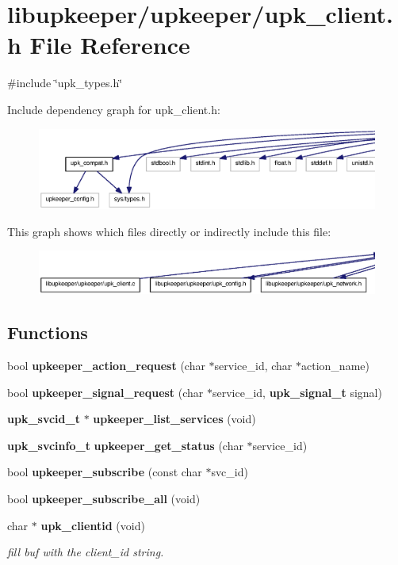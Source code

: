 \section{libupkeeper/upkeeper/upk\_\-client.h File Reference}
\label{upk__client_8h}
{\ttfamily \#include \char`\"{}upk\_\-types.h\char`\"{}}\par
Include dependency graph for upk\_\-client.h:
\nopagebreak
\begin{figure}[H]
\begin{center}
\leavevmode
\includegraphics[width=400pt]{upk__client_8h__incl}
\end{center}
\end{figure}
This graph shows which files directly or indirectly include this file:\nopagebreak
\begin{figure}[H]
\begin{center}
\leavevmode
\includegraphics[width=400pt]{upk__client_8h__dep__incl}
\end{center}
\end{figure}
\subsection*{Functions}
\begin{DoxyCompactItemize}
\item 
bool {\bf upkeeper\_\-action\_\-request} (char $\ast$service\_\-id, char $\ast$action\_\-name)
\item 
bool {\bf upkeeper\_\-signal\_\-request} (char $\ast$service\_\-id, {\bf upk\_\-signal\_\-t} signal)
\item 
{\bf upk\_\-svcid\_\-t} $\ast$ {\bf upkeeper\_\-list\_\-services} (void)
\item 
{\bf upk\_\-svcinfo\_\-t} {\bf upkeeper\_\-get\_\-status} (char $\ast$service\_\-id)
\item 
bool {\bf upkeeper\_\-subscribe} (const char $\ast$svc\_\-id)
\item 
bool {\bf upkeeper\_\-subscribe\_\-all} (void)
\item 
char $\ast$ {\bf upk\_\-clientid} (void)
\begin{DoxyCompactList}\small\item\em fill buf with the client\_\-id string. \end{DoxyCompactList}\end{DoxyCompactItemize}



